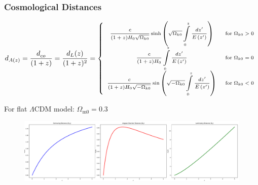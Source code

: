 \documentclass[xcolor=table,bigger]{beamer}
\begin{document}
  \begin{frame}
 \frametitle{ Cosmological  Distances}
\begin{flushleft}
$ {\scriptsize d_{A(z)}=\dfrac{d_{c o}^{}}{(1+z)}=\dfrac{d_{L}(z)}{(1+z)^{2}}=\left\{\begin{array}{cl}{\dfrac{c}{(1+z) H_{0} \sqrt{\Omega_{k 0}}} \sinh \left(\sqrt{\Omega_{k 0}} \displaystyle\int\limits_{0}^{z} \frac{d z^{\prime}}{E\left(z^{\prime}\right)}\right)} & {\text { for } \Omega_{k 0}>0} \\ {\dfrac{c}{(1+z) H_{0}} \displaystyle\int\limits_{0}^{z} \dfrac{d z^{\prime}}{E\left(z^{\prime}\right)}} & {\text { for } \Omega_{k 0}=0} \\ {\dfrac{c}{(1+z) H_{0} \sqrt{-\Omega_{k 0}}} \sin \left(\sqrt{-\Omega_{k 0}} \displaystyle\int\limits_{0}^{z} \frac{d z^{\prime}}{E\left(z^{\prime}\right)}\right)} & {\text { for } \Omega_{k 0}<0}\end{array}\right.}$
\end{flushleft}
For flat $\Lambda$CDM model: $\Omega_{\mathrm{m0}}=0.3$
\begin{figure}[ht!]
\centering
\includegraphics[width=115mm]{d_co_A_L_0_3.pdf}
\end{figure} 
 \end{frame}
\end{document}
